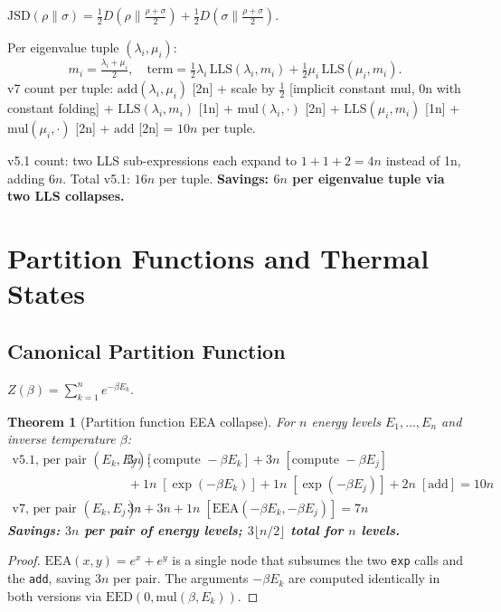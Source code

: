 \documentclass[11pt]{article}
\newtheorem{theorem}{Theorem}
\begin{document}
$\mathrm{JSD}(\rho\|\sigma)=\tfrac12D\!\left(\rho\|\tfrac{\rho+\sigma}{2}\right)+\tfrac12D\!\left(\sigma\|\tfrac{\rho+\sigma}{2}\right)$.

Per eigenvalue tuple $(\lambda_i,\mu_i)$:
\[
m_i=\tfrac{\lambda_i+\mu_i}{2},\quad
\text{term}=\tfrac12\lambda_i\,\mathrm{LLS}(\lambda_i,m_i)+\tfrac12\mu_i\,\mathrm{LLS}(\mu_i,m_i).
\]
v7 count per tuple: $\mathrm{add}(\lambda_i,\mu_i)$ [2n] + scale by $\tfrac12$ [implicit constant mul, 0n with constant folding]
+ $\mathrm{LLS}(\lambda_i,m_i)$ [1n] + $\mathrm{mul}(\lambda_i,\cdot)$ [2n] + $\mathrm{LLS}(\mu_i,m_i)$ [1n]
+ $\mathrm{mul}(\mu_i,\cdot)$ [2n] + $\mathrm{add}$ [2n] = $10n$ per tuple.

v5.1 count: two LLS sub-expressions each expand to $1+1+2=4n$ instead of 1n, adding $6n$.
Total v5.1: $16n$ per tuple.
\textbf{Savings: $6n$ per eigenvalue tuple via two LLS collapses.}

\section{Partition Functions and Thermal States}

\subsection{Canonical Partition Function}

$Z(\beta)=\sum_{k=1}^n e^{-\beta E_k}$.

\begin{theorem}[Partition function EEA collapse]
For $n$ energy levels $E_1,\ldots,E_n$ and inverse temperature $\beta$:
\begin{align*}
\text{v5.1, per pair }(E_k,E_j): &\quad
  3n\;[\text{compute }-\beta E_k] + 3n\;[\text{compute }-\beta E_j]\\
  &\quad+ 1n\;[\exp(-\beta E_k)] + 1n\;[\exp(-\beta E_j)] + 2n\;[\text{add}] = 10n\\
\text{v7, per pair }(E_k,E_j): &\quad
  3n + 3n + 1n\;[\mathrm{EEA}(-\beta E_k,-\beta E_j)] = 7n
\end{align*}
\textbf{Savings: $3n$ per pair of energy levels; $3\lfloor n/2\rfloor$ total for $n$ levels.}
\end{theorem}

\begin{proof}
$\mathrm{EEA}(x,y)=e^x+e^y$ is a single node that subsumes the two \texttt{exp} calls and
the \texttt{add}, saving $3n$ per pair. The arguments $-\beta E_k$ are computed identically
in both versions via $\mathrm{EED}(0,\mathrm{mul}(\beta,E_k))$.
\end{proof}
\end{document}
